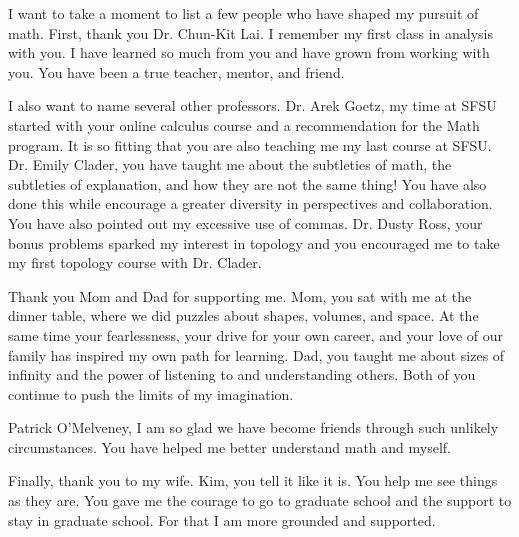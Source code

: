 \documentclass{article}
\begin{document}
I want to take a moment to list a few people who have shaped my pursuit of math.  First, thank you Dr. Chun-Kit Lai.  I remember my first class in analysis with you.  I have learned so much from you and have grown from working with you.  You have been a true teacher, mentor, and friend.  

I also want to name several other professors.  Dr. Arek Goetz, my time at SFSU started with your online calculus course and a recommendation for the Math program. It is so fitting that you are also teaching me my last course at SFSU.  Dr. Emily Clader, you have taught me about the subtleties of math, the subtleties of explanation, and how they are not the same thing! You have also done this while encourage a greater diversity in perspectives and collaboration.  You have also pointed out my excessive use of commas.  Dr. Dusty Ross, your bonus problems sparked my interest in topology and you encouraged me to take my first topology course with Dr. Clader.  

Thank you Mom and Dad for supporting me.  Mom, you sat with me at the dinner table, where we did puzzles about shapes, volumes, and space.  At the same time your fearlessness, your drive for your own career, and your love of our family has inspired my own path for learning.  Dad, you taught me about sizes of infinity and the power of listening to and understanding others.  Both of you continue to push the limits of my imagination. 


Patrick O'Melveney, I am so glad we have become friends through such unlikely circumstances.  You have helped me better understand math and myself.  

Finally, thank you to my wife.  Kim, you tell it like it is.  You help me see things as they are.  You gave me the courage to go to graduate school and the support to stay in graduate school.  For that I am more grounded and supported. 
\end{document}
